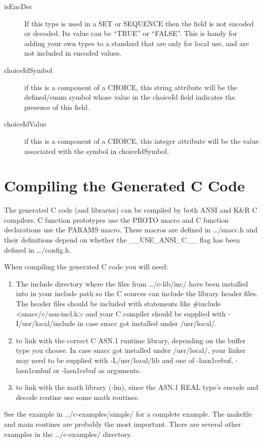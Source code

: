 \begin{description}
\item[isEncDec] { If this type is used in a SET or SEQUENCE then the
field is not encoded or decoded.  Its value can be ``TRUE'' or
``FALSE''.  This is handy for adding your own types to a standard that
are only for local use, and are not included in encoded values.}

\item[choiceIdSymbol] {if this is a component of a CHOICE, this string
attribute will be the defined/enum symbol whose value in the choiceId
field indicates the presence of this field.}
\item[choiceIdValue]  {if this is a component of a CHOICE, this integer
attribute will be the value associated with the symbol in choiceIdSymbol.}

\end{description}




\section{\label{compiling-gen-C-section}Compiling the Generated C Code}

The generated C code (and libraries) can be compiled by both ANSI and K\&R C compilers.
C function prototypes use the {\C PROTO} macro and C function declarations use the {\C PARAMS} macro.
These macros are defined in {\ufn \dots/snacc.h} and their definitions depend on whether the {\C \_\_USE\_ANSI\_C\_\_} flag has been defined in {\ufn \dots/config.h}.

When compiling the generated C code you will need:
\begin{enumerate}
\item
  The include directory where the files from {\ufn \dots/c-lib/inc/} have been installed into in your include path so the C sources can include the library header files.
  The header files should be included with statements like {\C \#include <snacc/c/asn-incl.h>} and your C compiler should be supplied with {\ufn -I/usr/local/include} in case snacc got installed under {\ufn /usr/local/}.
\item
  to link with the correct C ASN.1 runtime library, depending on the buffer type you choose.
  In case snacc got installed under {\ufn /usr/local/}, your linker may need to be supplied with {\ufn -L/usr/local/lib} and one of {\ufn -lasn1cebuf}, {\ufn -lasn1cmbuf} or {\ufn -lasn1csbuf} as arguments.
\item
  to link with the math library ({\ufn -lm}), since the ASN.1 REAL type's encode and decode routine use some math routines.
\end{enumerate}

See the example in {\ufn \dots/c-examples/simple/} for a complete
example. The makefile and main routines are probably the most
important.  There are several other examples in the
{\ufn \dots/c-examples/} directory.
